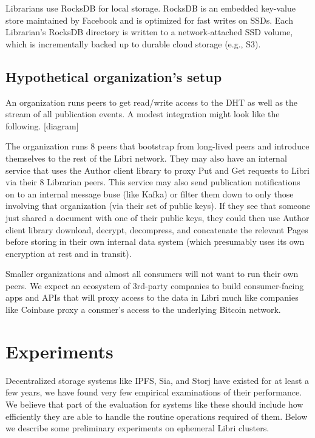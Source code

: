 \documentclass[10pt]{article}
\begin{document}
Librarians use RocksDB for local storage. RocksDB is an embedded key-value store maintained by Facebook and is optimized for fast writes on SSDs. Each Librarian's RocksDB directory is written to a network-attached SSD volume, which is incrementally backed up to durable cloud storage (e.g., S3). 


\subsection{Hypothetical organization's setup}

An organization runs peers to get read/write access to the DHT as well as the stream of all publication events. A modest integration might look like the following. [diagram]

The organization runs 8 peers that bootstrap from long-lived peers and introduce themselves to the rest of the Libri network. They may also have an internal service that uses the Author client library to proxy Put and Get requests to Libri via their 8 Librarian peers. This service may also send publication notifications on to an internal message buse (like Kafka) or filter them down to only those involving that organization (via their set of public keys). If they see that someone just shared a document with one of their public keys, they could then use Author client library download, decrypt, decompress, and concatenate the relevant Pages before storing in their own internal data system (which presumably uses its own encryption at rest and in transit).

Smaller organizations and almost all consumers will not want to run their own peers. We expect an ecosystem of 3rd-party companies to build consumer-facing apps and APIs that will proxy access to the data in Libri much like companies like Coinbase proxy a consmer's access to the underlying Bitcoin network.


\section{Experiments}
\label{sec:exps}

Decentralized storage systems like IPFS, Sia, and Storj have existed for at least a few years, we have found very few empirical examinations of their performance. We believe that part of the evaluation for systems like these should include how efficiently they are able to handle the routine operations required of them. Below we describe some preliminary experiments on ephemeral Libri clusters.
\end{document}
